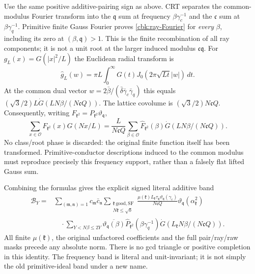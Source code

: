 Use the same positive additive-pairing sign as above. CRT separates
the common-modulus Fourier transform into the $\mathfrak q$ sum
at frequency $\beta\gamma_c^{-1}$ and the $\mathfrak c$ sum at
$\beta\gamma_q^{-1}$. Primitive finite Gauss Fourier proves
\eqref{cbk:ray-Fourier} for \emph{every} $\beta$, including its
zero at $(\beta,\mathfrak q)>1$. This is the finite recombination
of all ray components; it is not a unit root at the larger induced
modulus $\mathfrak c\mathfrak q$.
For $g_L(x)=G(|x|^2/L)$ the Euclidean radial transform is
\[
 \widehat g_L(w)=\pi L\int_0^\infty
                         G(t)J_0(2\pi\sqrt{Lt}|w|)\,dt.
\]
At the common dual vector
$w=2\bar\beta/(\bar\delta\bar\gamma_c\bar\gamma_q)$ this equals
$(\sqrt3/2)L\dot G(LN\beta/(N\mathfrak c Q))$.
The lattice covolume is $(\sqrt3/2)N\mathfrak c Q$.
Consequently, writing $F_{\mathfrak k^2}=P_{\mathfrak k^2}\vartheta_{\mathfrak q}$,
\begin{equation}\label{cbk:literal-Poisson}
 \sum_{x\in\mathcal O}F_{\mathfrak k^2}(x)G(Nx/L)
 =\frac L{N\mathfrak c Q}\sum_{\beta\in\mathcal O}
       \widehat F_{\mathfrak k^2}(\beta)
                            \dot G(LN\beta/(N\mathfrak c Q)).
\end{equation}
No class/root phase is discarded: the original finite function
itself has been transformed. Primitive-conductor descriptions
induced to the common modulus must reproduce precisely this
frequency support, rather than a falsely flat lifted Gauss sum.

Combining the formulas gives the explicit signed literal additive
band
\begin{equation}\label{cbk:literal-band}
 \begin{split}
 \mathcal B_Y={}&\sum_{(\mathfrak m,\mathfrak n)=1}
 c_{\mathfrak m}\bar c_{\mathfrak n}
 \sum_{\substack{\mathfrak k\ \mathrm{good,SF}\\N\mathfrak k\le\sqrt b}}
 \frac{\mu(\mathfrak k)L_{\mathfrak k}\tau_{\mathfrak q}
                    \vartheta_{\mathfrak q}(\gamma_c)}{N\mathfrak c Q}
             \vartheta_{\mathfrak q}(\alpha_{\mathfrak k}^2)\\
 &\quad\cdot\sum_{Y<N\beta\le2Y}
       \overline{\vartheta_{\mathfrak q}(\beta)}
       \widehat P_{\mathfrak k^2}(\beta\gamma_q^{-1})
                   \dot G(L_{\mathfrak k}N\beta/(N\mathfrak c Q)).
 \end{split}
\end{equation}
All finite $\mu(\mathfrak k)$, the original unfactored coefficients
and the full pair/ray/raw masks precede any absolute norm.
There is no gcd triangle or positive completion in this identity.
The frequency band is literal and unit-invariant; it is not simply
the old primitive-ideal band under a new name.

